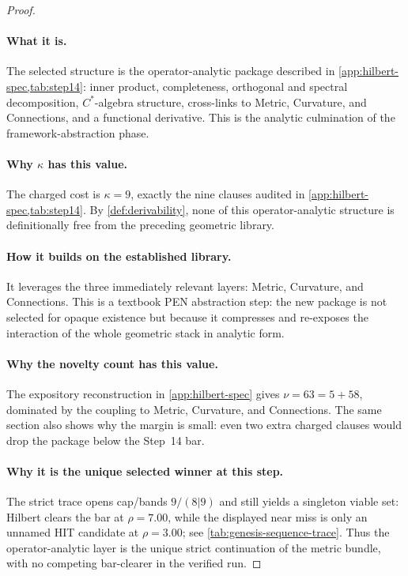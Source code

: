 \documentclass[11pt,a4paper]{article}
\theoremstyle{plain}
\theoremstyle{definition}
\theoremstyle{remark}
\begin{document}
\begin{proof}
\paragraph{What it is.}
The selected structure is the operator-analytic package described in
\cref{app:hilbert-spec,tab:step14}: inner product, completeness, orthogonal and
spectral decomposition, $C^*$-algebra structure, cross-links to Metric,
Curvature, and Connections, and a functional derivative.
This is the analytic culmination of the framework-abstraction phase.

\paragraph{Why $\kappa$ has this value.}
The charged cost is $\kappa=9$, exactly the nine clauses audited in
\cref{app:hilbert-spec,tab:step14}.
By \cref{def:derivability}, none of this operator-analytic structure is
definitionally free from the preceding geometric library.

\paragraph{How it builds on the established library.}
It leverages the three immediately relevant layers: Metric, Curvature, and
Connections.
This is a textbook PEN abstraction step: the new package is not selected for
opaque existence but because it compresses and re-exposes the interaction of the
whole geometric stack in analytic form.

\paragraph{Why the novelty count has this value.}
The expository reconstruction in \cref{app:hilbert-spec} gives
$\nu=63=5+58$, dominated by the coupling to Metric, Curvature, and Connections.
The same section also shows why the margin is small: even two extra charged
clauses would drop the package below the Step~14 bar.

\paragraph{Why it is the unique selected winner at this step.}
The strict trace opens cap/bands $9/(8|9)$ and still yields a singleton viable
set: Hilbert clears the bar at $\rho=7.00$, while the displayed near miss is
only an unnamed HIT candidate at $\rho=3.00$; see
\cref{tab:genesis-sequence-trace}.
Thus the operator-analytic layer is the unique strict continuation of the metric
bundle, with no competing bar-clearer in the verified run.
\end{proof}
\end{document}
